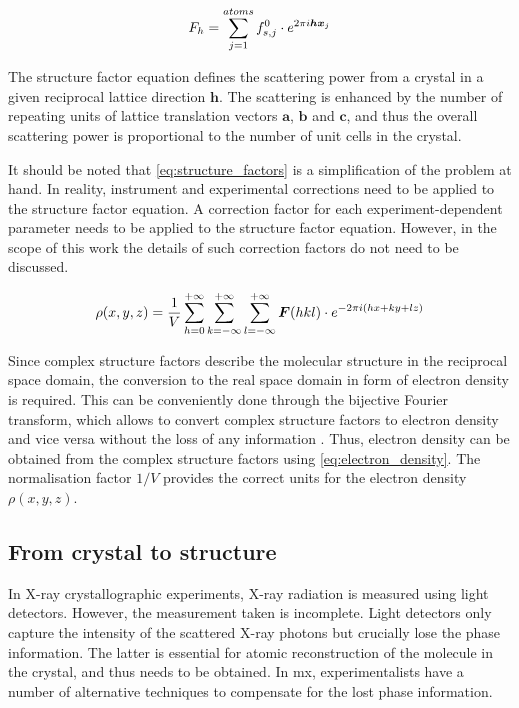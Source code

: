 \begin{equation}
    F_h=\sum_{j=1}^{atoms}f_{s,j}^0 \cdot e^{2\pi\\i\boldsymbol{h}\boldsymbol{x}_j}
    \label{eq:structure_factors}
\end{equation}

The structure factor equation defines the scattering power from a crystal in a given reciprocal lattice direction $\boldsymbol{h}$. The scattering is enhanced by the number of repeating units of lattice translation vectors $\boldsymbol{a}$, $\boldsymbol{b}$ and $\boldsymbol{c}$, and thus the overall scattering power is proportional to the number of unit cells in the crystal.

It should be noted that \cref{eq:structure_factors} is a simplification of the problem at hand. In reality, instrument and experimental corrections need to be applied to the structure factor equation. A correction factor for each experiment-dependent parameter needs to be applied to the structure factor equation. However, in the scope of this work the details of such correction factors do not need to be discussed.

\begin{equation}
    \rho(x,y,z)=\frac{1}{V}\sum_{h=0}^{+\infty}\sum_{k=-\infty}^{+\infty}\sum_{l=-\infty}^{+\infty}\boldsymbol{F}(hkl)\cdot e^{-2\pi\\i(hx+ky+lz)}
    \label{eq:electron_density}
\end{equation}

Since complex structure factors describe the molecular structure in the reciprocal space domain, the conversion to the real space domain in form of electron density is required. This can be conveniently done through the bijective Fourier transform, which allows to convert complex structure factors to electron density and vice versa without the loss of any information \cite{Rupp2010-nc}. Thus, electron density can be obtained from the complex structure factors using \cref{eq:electron_density}. The normalisation factor $1/V$ provides the correct units for the electron density $\rho(x,y,z)$.

\subsection{From crystal to structure}
In X-ray crystallographic experiments, X-ray radiation is measured using light detectors. However, the measurement taken is incomplete. Light detectors only capture the intensity of the scattered X-ray photons but crucially lose the phase information. The latter is essential for atomic reconstruction of the molecule in the crystal, and thus needs to be obtained.  In \gls{mx}, experimentalists have a number of alternative techniques to compensate for the lost phase information. 

